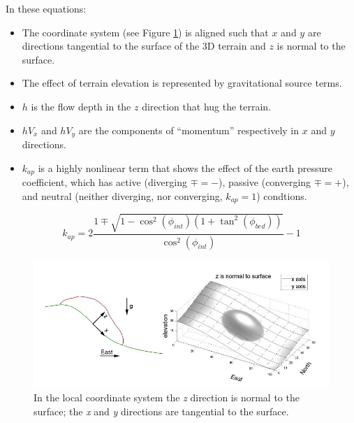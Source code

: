 \documentclass[letterpaper,10pt]{article}
\begin{document}
In these equations:
\begin{itemize}
\item The coordinate system (see Figure \ref{xzeast}) is aligned such that $x$ and $y$ are directions tangential  
      to the surface of the 3D terrain and $z$ is normal to the surface.
\item The effect of terrain elevation is represented by gravitational source terms. 
\item $h$ is the flow depth in the $z$ direction that hug the terrain.
\item $hV_x$ and $hV_y$ are the components of ``momentum'' respectively in $x$ and $y$ directions.
\item $k_{ap}$ is a highly nonlinear term that shows the effect of the earth pressure coefficient, which has active 
      (diverging $\mp=-$), passive (converging $\mp=+$), and neutral (neither diverging, nor converging, $k_{ap}=1$) condtions.
\end{itemize}

\begin{equation}
k_{ap}=2\frac{1\mp\sqrt{1-\cos^2(\phi_{int})\left(1+\tan^2(\phi_{bed})\right)}}{\cos^2(\phi_{int})}-1
\end{equation}

\begin{figure}[!t]
\begin{center}
 \includegraphics[height=2.8 truein]{IMAGES/1.jpg}
\caption{In the local coordinate system the {\itshape z} direction is normal to the surface; 
the {\itshape x} and {\itshape y} directions are tangential to the surface.}
\label{xzeast}
\end{center}
\end{figure}
\end{document}
